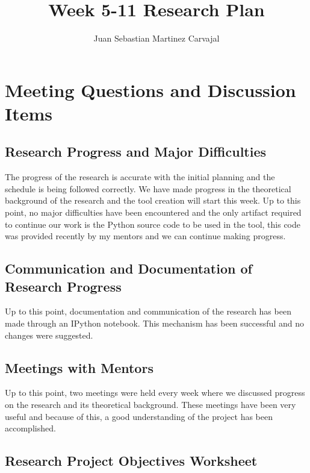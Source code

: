\documentclass[a4paper]{journal}
\title{Week 5-11 Research Plan}
\author{Juan Sebastian Martinez Carvajal}
\date{}
\begin{document}
\maketitle
\hrulefill

\section{Meeting Questions and Discussion Items}


\subsection{Research Progress and Major Difficulties}

The progress of the research is accurate with the initial planning and the schedule is being followed correctly. We have made progress in the theoretical background of the research and the tool creation will start this week. Up to this point, no major difficulties have been encountered and the only artifact required to continue our work is the Python source code to be used in the tool, this code was provided recently by my mentors and we can continue making progress.

\subsection{Communication and Documentation of Research Progress}

Up to this point, documentation and communication of the research has been made through an IPython notebook. This mechanism has been successful and no changes were suggested.

\subsection{Meetings with Mentors}

Up to this point, two meetings were held every week where we discussed progress on the research and its theoretical background. These meetings have been very useful and because of this, a good understanding of the project has been accomplished.

\subsection{Research Project Objectives Worksheet}
\end{document}
